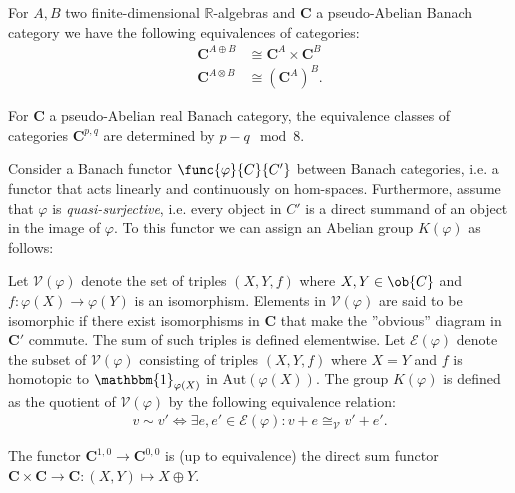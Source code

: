     \begin{property}
        For $A,B$ two finite-dimensional $\mathbb{R}$-algebras and $\mathbf{C}$ a pseudo-Abelian Banach category we have the following equivalences of categories:
        \begin{align}
            \mathbf{C}^{A\oplus B}&\cong\mathbf{C}^A\times\mathbf{C}^B\\
            \mathbf{C}^{A\otimes B}&\cong\left(\mathbf{C}^A\right)^B.
        \end{align}
    \end{property}
    \begin{property}\label{clifford:bott_periodicity_category}
        For $\mathbf{C}$ a pseudo-Abelian real Banach category, the equivalence classes of categories $\mathbf{C}^{p,q}$ are determined by $p-q\mod8$.
    \end{property}

    \begin{construct}\label{clifford:functor_k_group}
        Consider a Banach functor $\func{\varphi}{C}{C'}$ between Banach categories, i.e. a functor that acts linearly and continuously on hom-spaces. Furthermore, assume that $\varphi$ is \textit{quasi-surjective}, i.e. every object in $C'$ is a direct summand of an object in the image of $\varphi$. To this functor we can assign an Abelian group $K(\varphi)$ as follows:

        \qquad Let $\mathscr{V}(\varphi)$ denote the set of triples $(X,Y,f)$ where $X,Y\in\ob{C}$ and $f:\varphi(X)\rightarrow\varphi(Y)$ is an isomorphism. Elements in $\mathscr{V}(\varphi)$ are said to be isomorphic if there exist isomorphisms in $\mathbf{C}$ that make the ''obvious'' diagram in $\mathbf{C'}$ commute. The sum of such triples is defined elementwise. Let $\mathscr{E}(\varphi)$ denote the subset of $\mathscr{V}(\varphi)$ consisting of triples $(X,Y,f)$ where $X=Y$ and $f$ is homotopic to $\mathbbm{1}_{\varphi(X)}$ in $\text{Aut}(\varphi(X))$. The group $K(\varphi)$ is defined as the quotient of $\mathscr{V}(\varphi)$ by the following equivalence relation:
        \begin{gather}
            v\sim v' \iff \exists e,e'\in\mathscr{E}(\varphi):v+e\cong_{\mathscr{V}} v'+e'.
        \end{gather}
    \end{construct}

    \begin{example}[$K^{0,0}(\mathbf{C})$]\label{clifford:k00}
        The functor $\mathbf{C}^{1,0}\rightarrow\mathbf{C}^{0,0}$ is (up to equivalence) the direct sum functor $\mathbf{C}\times\mathbf{C}\rightarrow\mathbf{C}:(X,Y)\mapsto X\oplus Y$.
    \end{example}

